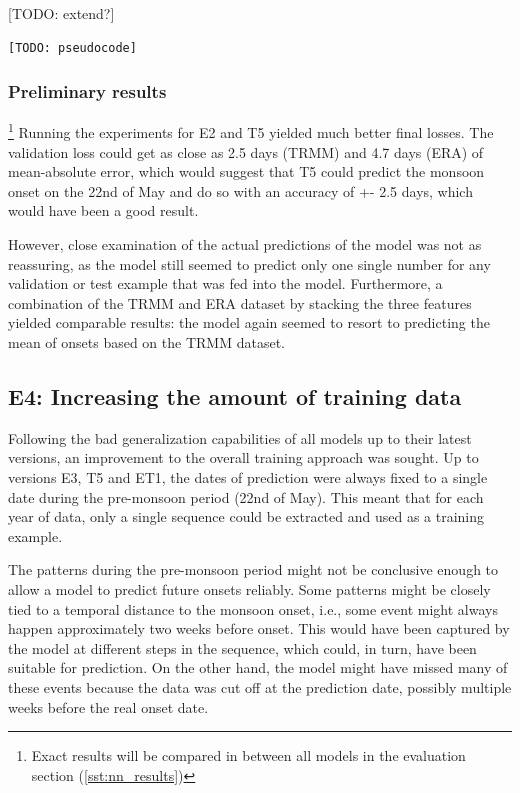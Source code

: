 [TODO: extend?]

\begin{figure}[h]
\end{figure}

\begin{lstlisting}[language=Python]
  [TODO: pseudocode]
\end{lstlisting}

\subsubsection{Preliminary results}{\footnote{Exact results will be compared in between all models in the evaluation section (\cref{sst:nn_results})}}
\label{ssst:nn_e2t5_results}
Running the experiments for E2 and T5 yielded much better final losses. The validation loss could get as close as 2.5 days (TRMM) and 4.7 days (ERA) of mean-absolute error, which would suggest that T5 could predict the monsoon onset on the 22nd of May and do so with an accuracy of +- 2.5 days, which would have been a good result.

However, close examination of the actual predictions of the model was not as reassuring, as the model still seemed to predict only one single number for any validation or test example that was fed into the model. Furthermore, a combination of the TRMM and ERA dataset by stacking the three features yielded comparable results: the model again seemed to resort to predicting the mean of onsets based on the TRMM dataset.


\clearpage
\subsection{E4: Increasing the amount of training data}
\label{sst:nn_e4}
Following the bad generalization capabilities of all models up to their latest versions, an improvement to the overall training approach was sought. Up to versions E3, T5 and ET1, the dates of prediction were always fixed to a single date during the pre-monsoon period (22nd of May). This meant that for each year of data, only a single sequence could be extracted and used as a training example.

The patterns during the pre-monsoon period might not be conclusive enough to allow a model to predict future onsets reliably. Some patterns might be closely tied to a temporal distance to the monsoon onset, i.e., some event might always happen approximately two weeks before onset. This would have been captured by the model at different steps in the sequence, which could, in turn, have been suitable for prediction. On the other hand, the model might have missed many of these events because the data was cut off at the prediction date, possibly multiple weeks before the real onset date.


